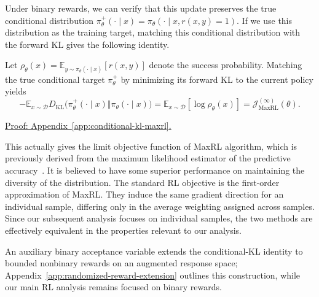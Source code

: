 Under binary rewards, we can verify that this update preserves the true conditional distribution
$\pi_\theta^+(\cdot\mid x)
=\pi_\theta(\cdot\mid x,r(x,y)=1)$. If we use this distribution as the training target, matching
this conditional distribution with the forward KL gives the following identity.

\begin{theorem}
\label{lem:conditional-kl-maxrl}
Let $\rho_\theta(x)=\mathbb E_{y\sim\pi_\theta(\cdot\mid x)}[r(x,y)]$
denote the success probability. Matching the true conditional target
$\pi_\theta^+$ by minimizing its forward KL to the current policy yields
\begin{equation}
 -\mathbb E_{x\sim\mathcal D}
 D_{\mathrm{KL}}\bigl(\pi_\theta^+(\cdot\mid x)
                  \Vert\pi_\theta(\cdot\mid x)\bigr)
 =\mathbb E_{x\sim\mathcal D}[\log\rho_\theta(x)]
 =\mathcal J_{\mathrm{MaxRL}}^{(\infty)}(\theta).
 \label{eq:conditional-kl-maxrl}
\end{equation}
\end{theorem}
\noindent\hyperref[app:conditional-kl-maxrl]{Proof: Appendix~\ref*{app:conditional-kl-maxrl}.}

This actually gives the limit objective function of MaxRL algorithm, which is previously derived from the maximum likelihood estimator of the predictive accuracy~\citep{tajwar_maximum_2026}. It is believed to have some superior performance on maintaining the diversity of the distribution. The standard RL objective is the first-order approximation of MaxRL. They induce the same gradient direction for an individual sample, differing only in the average weighting assigned across samples. Since our subsequent analysis focuses on individual samples, the two methods are effectively equivalent in the properties relevant to our analysis.

An auxiliary binary acceptance variable extends the conditional-KL identity to bounded nonbinary rewards on an augmented response space; Appendix~\ref{app:randomized-reward-extension} outlines this construction, while our main RL analysis remains focused on binary rewards.

